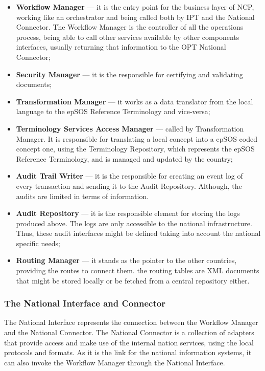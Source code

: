 \begin{itemize}
\item \textbf{Workflow Manager} --- it is the entry point for the business layer of NCP, working like an orchestrator and being called both by IPT and the National Connector. The Workflow Manager is the controller of all the operations process, being able to call other services available by other components interfaces, usually returning that information to the OPT National Connector;
\item \textbf{Security Manager} --- it is the responsible for certifying and validating documents;
\item \textbf{Transformation Manager} --- it works as a data translator from the local language to the epSOS Reference Terminology and vice-versa;
\item \textbf{Terminology Services Access Manager} --- called by Transformation Manager. It is responsible for translating a local concept into a epSOS coded concept one, using the Terminology Repository, which represents the epSOS Reference Terminology, and is managed and updated by the country;
\item \textbf{Audit Trail Writer} --- it is the responsible for creating an event log of every transaction and sending it to the Audit Repository. Although, the audits are limited in terms of information.
\item \textbf{Audit Repository} --- it is the responsible element for storing the logs produced above. The logs are only accessible to the national infrastructure. Thus, these audit interfaces might be defined taking into account the national specific needs;
\item \textbf{Routing Manager} --- it stands as the pointer to the other countries, providing the routes to connect them. the routing tables are XML documents that might be stored locally or be fetched from a central repository either. 
\end{itemize}

\subsubsection{The National Interface and Connector} \label{sec:epsos_ni}
The National Interface represents the connection between the Workflow Manager and the National Connector. The National Connector is a collection of adapters that provide access and make use of the internal nation services, using the local protocols and formats. As it is the link for the national information systems, it can also invoke the Workflow Manager through the National Interface.






